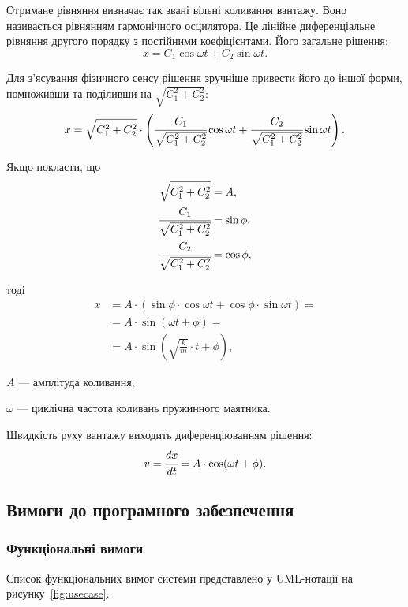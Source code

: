 Отримане рівняння визначає так звані вільні коливання вантажу.
Воно називається рівнянням гармонічного осцилятора.
Це лінійне диференціальне рівняння другого порядку з постійними коефіцієнтами.
Його загальне рішення:
\[
x = C_1 \cos \omega t + C_2 \sin \omega t.
\]

Для з'ясування фізичного сенсу рішення зручніше привести його до іншої форми, помноживши та поділивши на $\sqrt{C_1^2 + C_2^2}$:
\[
x = \sqrt{C_1^2 + C_2^2} \cdot \left( \cfrac{C_1}{\sqrt{C_1^2 + C_2^2}} \cos \omega t + \cfrac{C_2}{\sqrt{C_1^2 + C_2^2}} \sin \omega t \right).
\]

Якщо покласти, що
\begin{align*}
\sqrt{C_1^2 + C_2^2} &= A, \\
\cfrac{C_1}{\sqrt{C_1^2 + C_2^2}} &= \sin \phi, \\
\cfrac{C_2}{\sqrt{C_1^2 + C_2^2}} &= \cos \phi,
\end{align*}

тоді
\begin{align*}
x &= A \cdot (\sin\phi \cdot \cos \omega t + \cos\phi \cdot \sin \omega t) = \\
&= A \cdot \sin (\omega t + \phi) = \\
&= A \cdot \sin (\sqrt{\frac{k}{m}} \cdot t + \phi),
\end{align*}
\begin{description}
\item[де] $A$ --- амплітуда коливання;
\item $\omega$ --- циклічна частота коливань пружинного маятника.
\end{description}

Швидкість руху вантажу виходить диференціюванням рішення:
\[
v=\cfrac{dx}{dt}=A\cdot\cos(\omega t+\phi).
\]

\subsection{Вимоги до програмного забезпечення}
\subsubsection{Функціональні вимоги}
Список функціональних вимог системи представлено у UML-нотації на рисунку~\ref{fig:usecase}.

